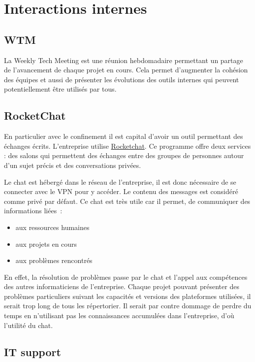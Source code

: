 \documentclass[french,a4paper,12pt]{report}
\begin{document}
\section{Interactions internes}

\subsection{WTM}

La Weekly Tech Meeting est une réunion hebdomadaire permettant un partage de l’avancement de chaque projet en cours. Cela permet d'augmenter la cohésion des équipes et aussi de présenter les évolutions des outils internes qui peuvent potentiellement être utilisés par tous.

\subsection{RocketChat}

En particulier avec le confinement il est capital d’avoir un outil permettant des échanges écrits. L'entreprise utilise \href{https://rocket.chat/}{Rocketchat}. Ce programme offre deux services : des salons qui permettent des échanges entre des groupes de personnes autour d'un sujet précis et des conversations privées.

Le chat est hébergé dans le réseau de l’entreprise, il est donc nécessaire de se connecter avec le VPN pour y accéder. Le contenu des messages est considéré comme privé par défaut.
Ce chat est très utile car il permet, de communiquer des informations liées :

\begin{itemize}
\setcounter{enumi}{-1}
\item aux ressources humaines
\item aux projets en cours
\item aux problèmes rencontrés
\end{itemize}

En effet, la résolution de problèmes passe par le chat et l'appel aux compétences des autres informaticiens de l’entreprise. Chaque projet pouvant présenter des problèmes particuliers suivant les capacités et versions des plateformes utilisées, il serait trop long de tous les répertorier. Il serait par contre dommage de perdre du temps en n’utilisant pas les connaissances accumulées dans l’entreprise, d'où l'utilité du chat. 

\subsection{IT support}
\end{document}
